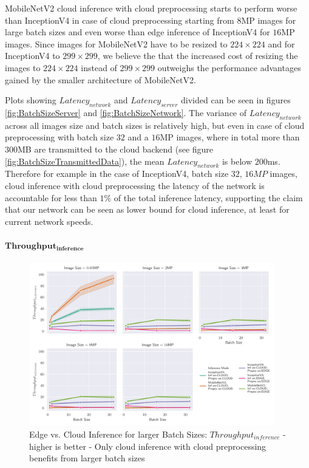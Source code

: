 MobileNetV2 cloud inference with cloud preprocessing starts to perform worse than InceptionV4 in case of cloud preprocessing starting from $8$MP images for large batch sizes and even worse than edge inference of InceptionV4 for $16$MP images.
Since images for MobileNetV2 have to be resized to $224\times224$ and for InceptionV4 to $299\times299$, we believe the that the increased cost of resizing the images to $224\times224$ instead of $299\times299$ outweighs the performance advantages gained by the smaller architecture of MobileNetV2.

Plots showing $Latency_{network}$ and $Latency_{server}$ divided can be seen in figures \ref{fig:BatchSizeServer} and \ref{fig:BatchSizeNetwork}.
The variance of $Latency_{network}$ across all images size and batch sizes is relatively high, but even in case of cloud preprocessing with batch size $32$ and a $16$MP images, where in total more than $300$MB are transmitted to the cloud backend (see figure \ref{fig:BatchSizeTransmittedData}), the mean $Latency_{network}$ is below $200$ms. 
Therefore for example in the case of InceptionV4, batch size $32$, $16MP$ images, cloud inference with cloud preprocessing the latency of the network is accountable for less than $1\%$ of the total inference latency, supporting the claim that our network can be seen as lower bound for cloud inference, at least for current network speeds.




\paragraph{$\mathbf{Throughput_{inference}}$}
\begin{figure}[!htb]
\centering
\includegraphics[width=0.95\textwidth]{./Bilder/single_plots/batch_size_plots/Effects_of_Batch_size_Inference_Throughput.pdf}
\caption[Edge vs. Cloud Inference for larger Batch Sizes:  $Throughput_{inference}$ - higher is better]{Edge vs. Cloud Inference for larger Batch Sizes:  $Throughput_{inference}$ - higher is better - Only cloud inference with cloud preprocessing benefits from larger batch sizes}
\label{fig:BatchSizeInferenceThroughput}
\end{figure}

